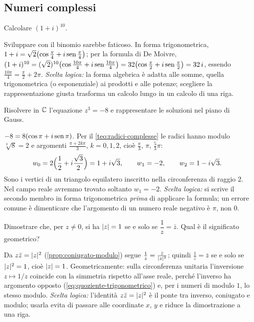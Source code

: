\subsection*{Numeri complessi}

\begin{esercizio}
Calcolare $(1+i)^{10}$.
\begin{soluzione}
Sviluppare con il binomio sarebbe faticoso. In forma trigonometrica,
$1+i=\sqrt2\bigl(\cos\frac\pi4+i\operatorname{sen}\frac\pi4\bigr)$; per la formula di De Moivre,
$(1+i)^{10}=(\sqrt2)^{10}\bigl(\cos\frac{10\pi}{4}+i\operatorname{sen}\frac{10\pi}{4}\bigr)
=32\bigl(\cos\frac{\pi}{2}+i\operatorname{sen}\frac\pi2\bigr)=32\,i$, essendo
$\frac{10\pi}{4}=\frac\pi2+2\pi$. \emph{Scelta logica:} la forma algebrica è adatta
alle somme, quella trigonometrica (o esponenziale) ai prodotti e alle potenze; scegliere
la rappresentazione giusta trasforma un calcolo lungo in un calcolo di una riga.
\end{soluzione}
\end{esercizio}

\begin{esercizio}
Risolvere in $\mathbb{C}$ l'equazione $z^{3}=-8$ e rappresentare le soluzioni nel piano di Gauss.
\begin{soluzione}
$-8=8(\cos\pi+i\operatorname{sen}\pi)$. Per il \cref{teo:radici-complesse} le radici hanno modulo
$\sqrt[3]8=2$ e argomenti $\frac{\pi+2k\pi}{3}$, $k=0,1,2$, cioè $\frac\pi3$, $\pi$,
$\frac53\pi$:
\[
  w_{0}=2\Bigl(\frac12+i\frac{\sqrt3}{2}\Bigr)=1+i\sqrt3, \qquad w_{1}=-2, \qquad
  w_{2}=1-i\sqrt3 .
\]
Sono i vertici di un triangolo equilatero inscritto nella circonferenza di raggio $2$.
Nel campo reale avremmo trovato soltanto $w_{1}=-2$. \emph{Scelta logica:} si scrive il
secondo membro in forma trigonometrica \emph{prima} di applicare la formula; un errore
comune è dimenticare che l'argomento di un numero reale negativo è $\pi$, non $0$.
\end{soluzione}
\end{esercizio}

\begin{esercizio}
Dimostrare che, per $z\neq0$, si ha $\lvert z\rvert=1$ se e solo se $\dfrac1z=\bar z$. Qual è
il significato geometrico?
\begin{soluzione}
Da $z\bar z=\lvert z\rvert^{2}$ (\cref{prop:coniugato-modulo}) segue $\frac1z=\frac{\bar
z}{\lvert z\rvert^{2}}$; quindi $\frac1z=\bar z$ se e solo se $\lvert z\rvert^{2}=1$, cioè $\lvert z\rvert=1$.
Geometricamente: sulla circonferenza unitaria l'inversione $z\mapsto1/z$ coincide con la
simmetria rispetto all'asse reale, perché l'inverso ha argomento opposto
(\eqref{eq:quoziente-trigonometrico}) e, per i numeri di modulo $1$, lo stesso modulo.
\emph{Scelta logica:} l'identità $z\bar z=\lvert z\rvert^{2}$ è il ponte tra inverso, coniugato e
modulo; usarla evita di passare alle coordinate $x$, $y$ e riduce la dimostrazione a una
riga.
\end{soluzione}
\end{esercizio}

